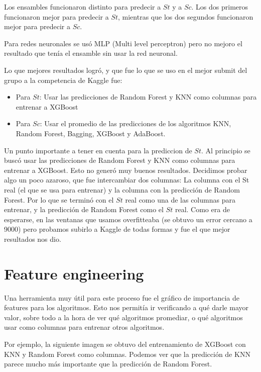 \documentclass{article}
\begin{document}
Los ensambles funcionaron distinto para predecir a $St$ y a $Sc$.
Los dos primeros funcionaron mejor para predecir a $St$, mientras que los dos segundos funcionaron mejor para predecir a $Sc$.

Para redes neuronales se usó MLP (Multi level perceptron) pero no mejoro el resultado que tenía el ensamble sin usar la red neuronal.

Lo que mejores resultados logró, y que fue lo que se uso en el mejor submit del grupo a la competencia de Kaggle fue:
\begin{itemize}
    \item Para $St$: Usar las predicciones de Random Forest y KNN como columnas para entrenar a XGBoost 
    \item Para $Sc$: Usar el promedio de las predicciones de los algoritmos KNN, Random Forest, Bagging, XGBoost y AdaBoost.
\end{itemize}

Un punto importante a tener en cuenta para la prediccion de $St$.
Al principio se buscó usar las predicciones de Random Forest y KNN como columnas para entrenar a XGBoost. Esto no generó muy buenos resultados. 
Decidimos probar algo un poco azaroso, que fue intercambiar dos columnas: La columna con el St real (el que se usa para entrenar) y la columna con la predicción de Random Forest. Por lo que se terminó con el $St$ real como una de las columnas para entrenar, y la predicción de Random Forest como el $St$ real.
Como era de esperarse, en las ventanas que usamos overfitteaba (se obtuvo un error cercano a 9000) pero probamos subirlo a Kaggle de todas formas y fue el que mejor resultados nos dio.

\newpage
\section{Feature engineering}
Una herramienta muy útil para este proceso fue el gráfico de importancia de features para los algoritmos. Esto nos permitía ir verificando a qué darle mayor valor, sobre todo a la hora de ver qué algoritmos promediar, o qué algoritmos usar como columnas para entrenar otros algoritmos.

Por ejemplo, la siguiente imagen se obtuvo del entrenamiento de XGBoost con KNN y Random Forest como columnas.  Podemos ver que la predicción de KNN parece mucho más importante que la predicción de Random Forest.

\begin{figure}[H]
    \centering
\end{figure}
\end{document}
